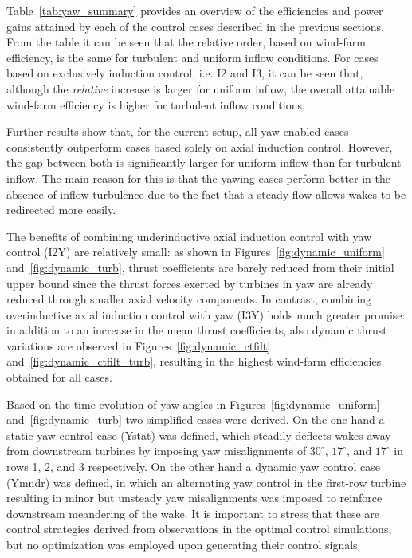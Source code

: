 Table~\ref{tab:yaw_summary} provides an overview of the efficiencies and power gains attained by each of the control cases described in the previous sections. From the table it can be seen that the relative order, based on wind-farm efficiency, is the same for turbulent and uniform inflow conditions. For cases based on exclusively induction control, i.e. I2 and I3, it can be seen that, although the \emph{relative} increase is larger for uniform inflow, the overall attainable wind-farm efficiency is higher for turbulent inflow conditions. 

Further results show that, for the current setup, all yaw-enabled cases consistently outperform cases based solely on axial induction control. However, the gap between both is significantly larger for uniform inflow than for turbulent inflow. The main reason for this is that the yawing cases perform better in the absence of inflow turbulence due to the fact that a steady flow allows wakes to be redirected more easily. 

The benefits of combining underinductive axial induction control with yaw control (I2Y) are relatively small: as shown in Figures~\ref{fig:dynamic_uniform} and~\ref{fig:dynamic_turb}, thrust coefficients are barely reduced from their initial upper bound since the thrust forces exerted by turbines in yaw are already reduced through smaller axial velocity components. In contrast, combining overinductive axial induction control with yaw (I3Y) holds much greater promise: in addition to an increase in the mean thrust coefficients, also dynamic thrust variations are observed in Figures~\ref{fig:dynamic_ctfilt} and~\ref{fig:dynamic_ctfilt_turb}, resulting in the highest wind-farm efficiencies obtained for all cases. 

Based on the time evolution of yaw angles in Figures~\ref{fig:dynamic_uniform} and~\ref{fig:dynamic_turb} two simplified cases were derived. On the one hand a static yaw control case (Ystat) was defined, which steadily deflects wakes away from downstream turbines by imposing yaw misalignments of $30^\circ$, $17^\circ$, and $17^\circ$ in rows 1, 2, and 3 respectively. On the other hand a dynamic yaw control case (Ymndr) was defined, in which an alternating yaw control in the first-row turbine resulting in minor but unsteady yaw misalignments was imposed to reinforce downstream meandering of the wake. It is important to stress that these are control strategies derived from observations in the optimal control simulations, but no optimization was employed upon generating their control signals. 

